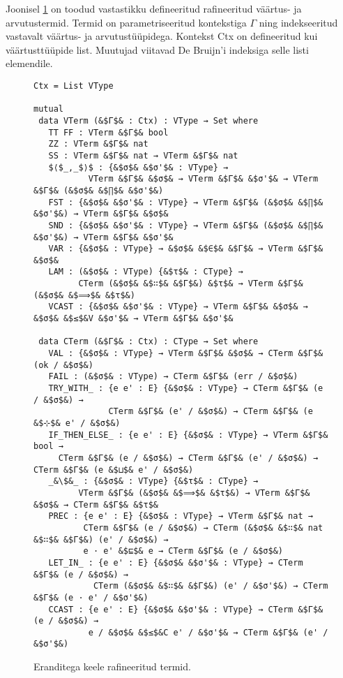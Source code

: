 \documentclass[a4paper,12pt]{article}
\begin{document}
Joonisel \ref{fig:exc.refined} on toodud vastastikku defineeritud rafineeritud väärtus- ja arvutustermid.
Termid on parametriseeritud kontekstiga $Γ$ ning indekseeritud vastavalt väärtus- ja arvutustüüpidega.
Kontekst Ctx on defineeritud kui väärtusttüüpide list. Muutujad viitavad De Bruijn'i indeksiga selle listi elemendile.
\begin{figure}
  \begin{lstlisting}
Ctx = List VType

mutual
 data VTerm (&$Γ$& : Ctx) : VType → Set where
   TT FF : VTerm &$Γ$& bool
   ZZ : VTerm &$Γ$& nat
   SS : VTerm &$Γ$& nat → VTerm &$Γ$& nat
   $⟨$_,_$⟩$ : {&$σ$& &$σ'$& : VType} →
           VTerm &$Γ$& &$σ$& → VTerm &$Γ$& &$σ'$& → VTerm &$Γ$& (&$σ$& &$∏$& &$σ'$&)
   FST : {&$σ$& &$σ'$& : VType} → VTerm &$Γ$& (&$σ$& &$∏$& &$σ'$&) → VTerm &$Γ$& &$σ$&
   SND : {&$σ$& &$σ'$& : VType} → VTerm &$Γ$& (&$σ$& &$∏$& &$σ'$&) → VTerm &$Γ$& &$σ'$&
   VAR : {&$σ$& : VType} → &$σ$& &$∈$& &$Γ$& → VTerm &$Γ$& &$σ$&
   LAM : (&$σ$& : VType) {&$τ$& : CType} →
         CTerm (&$σ$& &$∷$& &$Γ$&) &$τ$& → VTerm &$Γ$& (&$σ$& &$⟹$& &$τ$&)
   VCAST : {&$σ$& &$σ'$& : VType} → VTerm &$Γ$& &$σ$& → &$σ$& &$≤$&V &$σ'$& → VTerm &$Γ$& &$σ'$&

 data CTerm (&$Γ$& : Ctx) : CType → Set where
   VAL : {&$σ$& : VType} → VTerm &$Γ$& &$σ$& → CTerm &$Γ$& (ok / &$σ$&)
   FAIL : (&$σ$& : VType) → CTerm &$Γ$& (err / &$σ$&)
   TRY_WITH_ : {e e' : E} {&$σ$& : VType} → CTerm &$Γ$& (e / &$σ$&) →
               CTerm &$Γ$& (e' / &$σ$&) → CTerm &$Γ$& (e &$⊹$& e' / &$σ$&)
   IF_THEN_ELSE_ : {e e' : E} {&$σ$& : VType} → VTerm &$Γ$& bool →
     CTerm &$Γ$& (e / &$σ$&) → CTerm &$Γ$& (e' / &$σ$&) → CTerm &$Γ$& (e &$⊔$& e' / &$σ$&)
   _&\$&_ : {&$σ$& : VType} {&$τ$& : CType} →
         VTerm &$Γ$& (&$σ$& &$⟹$& &$τ$&) → VTerm &$Γ$& &$σ$& → CTerm &$Γ$& &$τ$&
   PREC : {e e' : E} {&$σ$& : VType} → VTerm &$Γ$& nat →
          CTerm &$Γ$& (e / &$σ$&) → CTerm (&$σ$& &$∷$& nat &$∷$& &$Γ$&) (e' / &$σ$&) →
          e · e' &$⊑$& e → CTerm &$Γ$& (e / &$σ$&)
   LET_IN_ : {e e' : E} {&$σ$& &$σ'$& : VType} → CTerm &$Γ$& (e / &$σ$&) →
            CTerm (&$σ$& &$∷$& &$Γ$&) (e' / &$σ'$&) → CTerm &$Γ$& (e · e' / &$σ'$&)
   CCAST : {e e' : E} {&$σ$& &$σ'$& : VType} → CTerm &$Γ$& (e / &$σ$&) →
           e / &$σ$& &$≤$&C e' / &$σ'$& → CTerm &$Γ$& (e' / &$σ'$&)
  \end{lstlisting}
  \caption{Eranditega keele rafineeritud termid.}
  \label{fig:exc.refined}
\end{figure}
\end{document}
